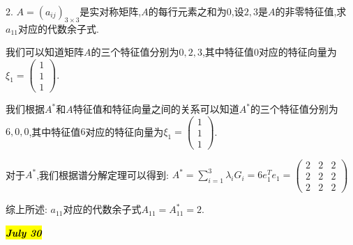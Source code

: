 2. $A=(a_{ij})_{3\times 3}$是实对称矩阵,$A$的每行元素之和为$0$,设$2,3$是$A$的非零特征值,求$a_{11}$对应的代数余子式.
\begin{solution}
	
	我们可以知道矩阵$A$的三个特征值分别为$0,2,3$,其中特征值$0$对应的特征向量为$\xi_{1}=\left( \begin{matrix}
		1\\1\\1
	\end{matrix}\right)$.

我们根据$A^{*}$和$A$特征值和特征向量之间的关系可以知道$A^{*}$的三个特征值分别为$6,0,0$,其中特征值$6$对应的特征向量为$\xi_{1}=\left( \begin{matrix}
	1\\1\\1
\end{matrix}\right)$.

对于$A^{*}$,我们根据谱分解定理可以得到: $A^{*}=\sum\limits_{i=1}^{3}\lambda_{i}G_{i}=6e_{1}^{T}e_{1}=\left( \begin{matrix}
	2&2&2\\2&2&2\\2&2&2
\end{matrix}\right) $

综上所述: $a_{11}$对应的代数余子式$A_{11}=A^{*}_{11}=2$.
\end{solution}

\hl{\textbf{\textit{July 30}}}

